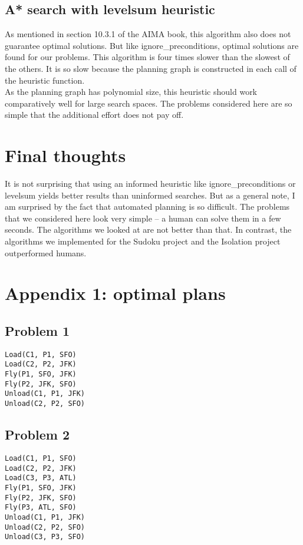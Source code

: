 \documentclass[11pt]{scrartcl}
\begin{document}
\subsection*{A* search with levelsum
heuristic}\label{a-search-with-levelsum-heuristic}
As mentioned in section 10.3.1 of the AIMA book, this algorithm also does not guarantee optimal solutions. But like ignore\_preconditions, optimal solutions are found for our problems. This algorithm is four times slower than the slowest of the others. It is so slow because the planning graph is constructed in each call of the heuristic function.\\

As the planning graph has polynomial size, this heuristic should work comparatively well for large search spaces. The problems considered here are so simple that
the additional effort does not pay off.

\section*{Final thoughts}\label{final-thoughts}

It is not surprising that using an informed heuristic like
ignore\_preconditions or levelsum yields better results than uninformed
searches. But as a general note, I am surprised by the fact that
automated planning is so difficult. The problems that we considered here
look very simple -- a human can solve them in a few seconds. The
algorithms we looked at are not better than that. In contrast, the
algorithms we implemented for the Sudoku project and the Isolation
project outperformed humans.

\section*{Appendix 1: optimal plans}\label{appendix-1-optimal-plans}

\subsection*{Problem 1}\label{problem-1}
\begin{verbatim}
Load(C1, P1, SFO)
Load(C2, P2, JFK)
Fly(P1, SFO, JFK)
Fly(P2, JFK, SFO)
Unload(C1, P1, JFK)
Unload(C2, P2, SFO)
\end{verbatim}
\subsection*{Problem 2}\label{problem-2}
\begin{verbatim}
Load(C1, P1, SFO)
Load(C2, P2, JFK)
Load(C3, P3, ATL)
Fly(P1, SFO, JFK)
Fly(P2, JFK, SFO)
Fly(P3, ATL, SFO)
Unload(C1, P1, JFK)
Unload(C2, P2, SFO)
Unload(C3, P3, SFO)
\end{verbatim}
\end{document}
